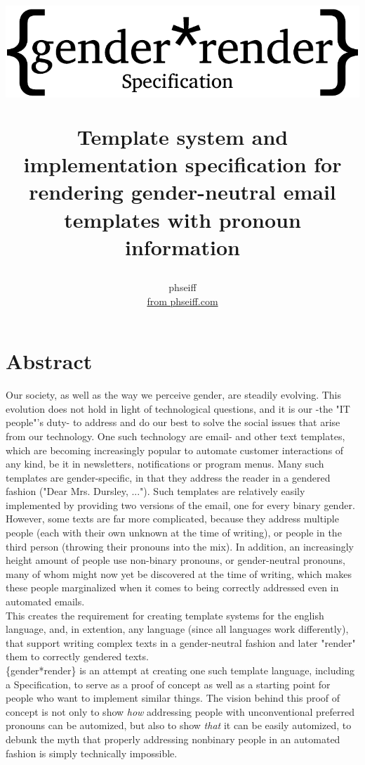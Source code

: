 \documentclass{article}
\author{phseiff\\ \href{https://phseiff.com}{from phseiff.com}}
\title{\begin{center}
           \includegraphics{images/title-black.pdf}
\end{center} Template system and implementation specification for rendering gender-neutral email templates with pronoun information}
\begin{document}
\maketitle
\tableofcontents

\section{Abstract}

    Our society, as well as the way we perceive gender, are steadily evolving.
    This evolution does not hold in light of technological questions, and it is our -the "IT people"'s duty- to address and do our best to solve the social issues that arise from our technology.
    One such technology are email- and other text templates, which are becoming increasingly popular to automate customer interactions of any kind, be it in newsletters, notifications or program menus.
    Many such templates are gender-specific, in that they address the reader in a gendered fashion ("Dear Mrs. Dursley, ...").
    Such templates are relatively easily implemented by providing two versions of the email, one for every binary gender.
    However, some texts are far more complicated, because they address multiple people (each with their own unknown at the time of writing), or people in the third person (throwing their pronouns into the mix).
    In addition, an increasingly height amount of people use non-binary pronouns, or gender-neutral pronouns, many of whom might now yet be discovered at the time of writing, which makes these people marginalized when it comes to being correctly addressed even in automated emails.\\

    This creates the requirement for creating template systems for the english language, and, in extention, any language (since all languages work differently), that support writing complex texts in a gender-neutral fashion and later "render" them to correctly gendered texts.\\

    \{gender*render\} is an attempt at creating one such template language, including a Specification, to serve as a proof of concept as well as a starting point for people who want to implement similar things.
    The vision behind this proof of concept is not only to show \emph{how} addressing people with unconventional preferred pronouns can be automized, but also to show \emph{that} it can be easily automized, to debunk the myth that properly addressing nonbinary people in an automated fashion is simply technically impossible.
\end{document}
